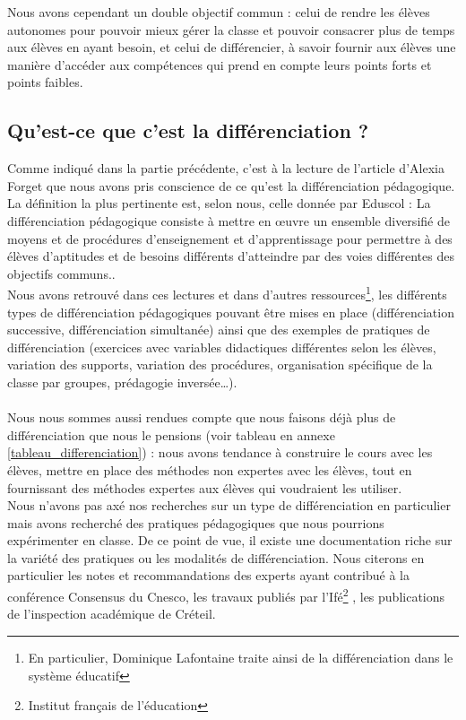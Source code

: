   Nous avons cependant un double objectif commun : celui de rendre les élèves autonomes pour pouvoir mieux gérer la classe et pouvoir consacrer plus de temps aux élèves en ayant besoin, et celui de différencier, à savoir fournir aux élèves une manière d’accéder aux compétences qui prend en compte leurs points forts et points faibles.


\subsection{Qu'est-ce que c'est la différenciation ?}
Comme indiqué dans la partie précédente, c'est à la lecture de l'article d'Alexia Forget\cite{cnesco_etat_lieux} que nous avons pris conscience de ce qu'est la différenciation pédagogique. La définition la plus pertinente est, selon nous, celle donnée par Eduscol\cite{Eduscol} : \og La différenciation pédagogique consiste à mettre en \oe{}uvre un ensemble diversifié de moyens
et de procédures d’enseignement et d’apprentissage pour permettre à des élèves d’aptitudes
et de besoins différents d’atteindre par des voies différentes des objectifs communs.\fg{}.\\
Nous avons retrouvé dans ces lectures et dans d'autres ressources\footnote{En particulier, Dominique Lafontaine\cite{cnesco_Lafontaine} traite ainsi de la différenciation dans le système éducatif}, les différents types de différenciation pédagogiques pouvant être mises en place (différenciation successive, différenciation simultanée) ainsi que des exemples de pratiques de différenciation (exercices avec variables didactiques différentes selon les élèves, variation des supports, variation des procédures, organisation spécifique de la classe par groupes, prédagogie inversée\ldots).
\paragraph{}Nous nous sommes aussi rendues compte que nous faisons déjà plus de différenciation que nous le pensions (voir tableau en annexe \ref{tableau_differenciation}) : nous avons tendance à construire le cours avec les élèves, mettre en place des méthodes non expertes avec les élèves, tout en fournissant des méthodes expertes aux élèves qui voudraient les utiliser.\\
Nous n'avons pas axé nos recherches sur un type de différenciation en particulier mais avons recherché des pratiques pédagogiques que nous pourrions expérimenter en classe. De ce point de vue, il existe une documentation riche sur la variété des pratiques ou les modalités de différenciation. Nous citerons en particulier les notes et recommandations des experts ayant contribué à la conférence \og Consensus \fg{} du Cnesco\cite{cnesco_notes_experts}\cite{cnesco_synthese}, les travaux publiés par l'Ifé\footnote{Institut français de l'éducation} , les publications de l'inspection académique de Créteil\cite{IPR_math_mouvement}.

